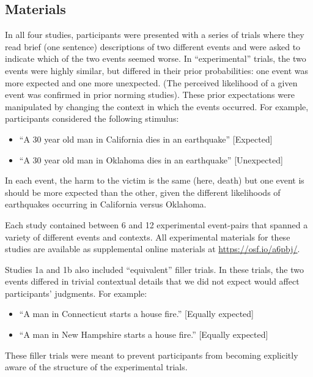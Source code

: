 \documentclass[10pt, letterpaper]{article}
\begin{document}
\subsection{Materials}\label{materials}

In all four studies, participants were presented with a series of trials
where they read brief (one sentence) descriptions of two different
events and were asked to indicate which of the two events seemed worse.
In ``experimental'' trials, the two events were highly similar, but
differed in their prior probabilities: one event was more expected and
one more unexpected. (The perceived likelihood of a given event was
confirmed in prior norming studies). These prior expectations were
manipulated by changing the context in which the events occurred. For
example, participants considered the following stimulus:

\begin{itemize}
\item
  ``A 30 year old man in California dies in an earthquake''
  {[}Expected{]}
\item
  ``A 30 year old man in Oklahoma dies in an earthquake''
  {[}Unexpected{]}
\end{itemize}

In each event, the harm to the victim is the same (here, death) but one
event is should be more expected than the other, given the different
likelihoods of earthquakes occurring in California versus Oklahoma.

Each study contained between 6 and 12 experimental event-pairs that
spanned a variety of different events and contexts. All experimental
materials for these studies are available as supplemental online
materials at \url{https://osf.io/a6pbj/}.

Studies 1a and 1b also included ``equivalent'' filler trials. In these
trials, the two events differed in trivial contextual details that we
did not expect would affect participants' judgments. For example:

\begin{itemize}
\item
  ``A man in Connecticut starts a house fire.'' {[}Equally expected{]}
\item
  ``A man in New Hampshire starts a house fire.'' {[}Equally expected{]}
\end{itemize}

These filler trials were meant to prevent participants from becoming
explicitly aware of the structure of the experimental trials.
\end{document}
